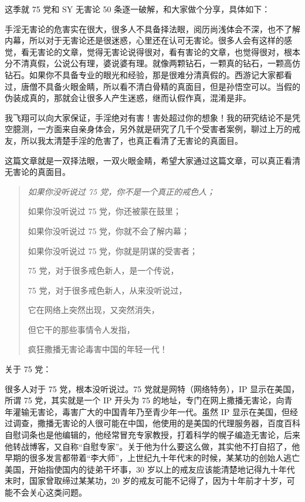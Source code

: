 这季就 75 党和 SY 无害论 50 条逐一破解，和大家做个分享，具体如下：

手淫无害论的危害实在很大，很多人不具备择法眼，阅历尚浅体会不深，也不了解内幕，所以对于无害论还是很迷惑，心里还在认可无害论。很多人会有这样的感觉，看无害论的文章，觉得无害论说得很对，看有害论的文章，也觉得很对，根本分不清真假，公说公有理，婆说婆有理。就像两颗钻石，一颗真的钻石，一颗高仿钻石。如果你不具备专业的眼光和经验，那是很难分清真假的。西游记大家都看过，唐僧不具备火眼金睛，所以看不清白骨精的真面目，但是孙悟空可以。当假的伪装成真的，那就会让很多人产生迷惑，继而认假作真，混淆是非。

我飞翔可以向大家保证，手淫绝对有害！害处超过你的想象！我的研究结论不是凭空臆测，一方面来自亲身体会，另外就是研究了几千个受害者案例，聊过上万的戒友，所以我太清楚手淫的危害了，也真正看清了无害论的真面目。

这篇文章就是一双择法眼，一双火眼金睛，希望大家通过这篇文章，可以真正看清无害论的真面目。

\begin{quotation}\it
    如果你没听说过 75 党，你不是一个真正的戒色人；

    如果你没听说过 75 党，你还被蒙在鼓里；

    如果你没听说过 75 党，你就不会了解内幕；

    如果你没听说过 75 党，你就是阴谋的受害者；

    75 党，对于很多戒色新人，是一个传说，

    75 党，对于很多戒色新人，从来没听说过，

    它在网络上突然出现，又突然消失，

    但它干的那些事情令人发指，

    疯狂撒播无害论毒害中国的年轻一代！
\end{quotation}

关于 75 党：

很多人对于 75 党，根本没听说过。75 党就是网特（网络特务），IP 显示在美国，所谓 75 党，其实就是一个 IP 开头为 75 的地址，专门在网上撒播无害论，向青年灌输无害论，毒害广大的中国青年乃至青少年一代。虽然 IP 显示在美国，但经过调查，撒播无害论的人很可能在中国，他使用的是美国的代理服务器，百度百科自慰词条也是他编辑的，他经常冒充专家教授，打着科学的幌子编造无害论，后来他转战博客，又自称“自慰专家”。关于他为什么要这么做，其实他不打自招了，他早期的很多发言都带着“李大师”，上世纪九十年代末的时候，某某功的创始人逃亡美国，开始指使国内的徒弟干坏事，30 岁以上的戒友应该能清楚地记得九十年代末时，国家曾取缔过某某功，20 岁的戒友可能不记得了，因为十年前才十岁，可能不会关心这类问题。

